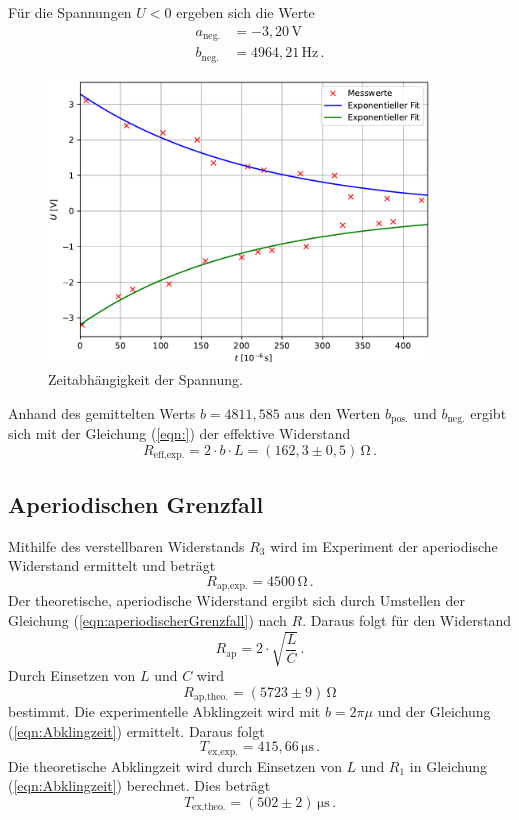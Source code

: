 Für die Spannungen $U < 0$ ergeben sich die Werte
\begin{align*}
  a_{\text{neg.}} &= -3,20\,\unit{\volt}\\
  b_{\text{neg.}} &= 4964,21\,\unit{\hertz}\,.
\end{align*}
\begin{figure}[H]
  \centering
  \includegraphics[width=0.90\textwidth]{plot_a.pdf}
  \caption{Zeitabhängigkeit der Spannung.}
  \label{fig:gedämpfteSchwingung}
\end{figure}
Anhand des gemittelten Werts $b = 4811,585$ aus den Werten $b_{\text{pos.}}$ und $b_{\text{neg.}}$ ergibt sich mit der Gleichung (\ref{eqn:})
der effektive Widerstand 
$$R_{\text{eff,exp.}} = 2\cdot b\cdot L = \left(162,3\pm0,5\right)\,\unit{\ohm}\,.$$
%
%
%
\subsection{Aperiodischen Grenzfall}
Mithilfe des verstellbaren Widerstands $R_3$ wird im Experiment der aperiodische Widerstand ermittelt und beträgt
$$R_{\text{ap,exp.}} = 4500\,\unit{\ohm}\,.$$
Der theoretische, aperiodische Widerstand ergibt sich durch Umstellen der Gleichung (\ref{eqn:aperiodischerGrenzfall}) nach $R$. Daraus folgt für 
den Widerstand
$$R_\text{ap}= 2\cdot \sqrt{\frac{L}{C}}\,.$$
Durch Einsetzen von $L$ und $C$ wird
$$R_{\text{ap,theo.}} = (5723\pm9)\,\unit{\ohm}$$ bestimmt.
Die experimentelle Abklingzeit wird mit $b = 2 \pi \mu$ und der Gleichung (\ref{eqn:Abklingzeit}) ermittelt. Daraus folgt
$$T_{\text{ex,exp.}}= 415,66\,\unit{\micro\second}\,.$$
Die theoretische Abklingzeit wird durch Einsetzen von $L$ und $R_1$ in Gleichung (\ref{eqn:Abklingzeit}) berechnet. Dies beträgt
$$T_{\text{ex,theo.}}= \left(502\pm2\right)\,\unit{\micro\second}\,.$$
%
%
%
